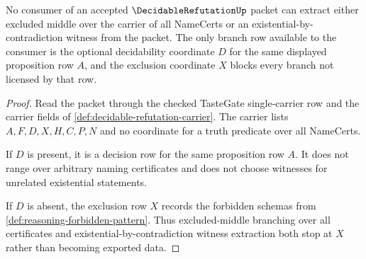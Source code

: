 \begin{theorem}
\label{thm:decidable-refutation-truth-branch-exclusion}
No consumer of an accepted $\DecidableRefutationUp$ packet can extract either excluded middle over the carrier of all NameCerts or an existential-by-contradiction witness from the packet. The only branch row available to the consumer is the optional decidability coordinate $D$ for the same displayed proposition row $A$, and the exclusion coordinate $X$ blocks every branch not licensed by that row.
\end{theorem}
\begin{proof}
Read the packet through the checked TasteGate single-carrier row and the carrier fields of \autoref{def:decidable-refutation-carrier}. The carrier lists $A,F,D,X,H,C,P,N$ and no coordinate for a truth predicate over all NameCerts.

If $D$ is present, it is a decision row for the same proposition row $A$. It does not range over arbitrary naming certificates and does not choose witnesses for unrelated existential statements.

If $D$ is absent, the exclusion row $X$ records the forbidden schemas from \autoref{def:reasoning-forbidden-pattern}. Thus excluded-middle branching over all certificates and existential-by-contradiction witness extraction both stop at $X$ rather than becoming exported data.
\end{proof}


